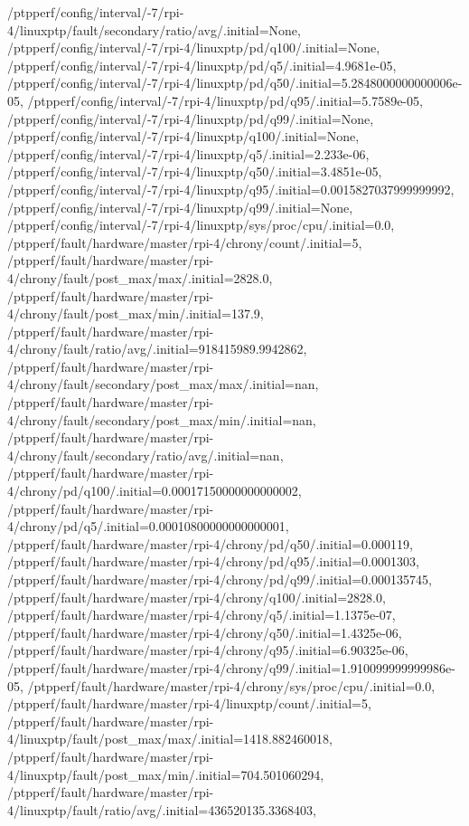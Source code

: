 {    /ptpperf/config/interval/-7/rpi-4/linuxptp/fault/secondary/ratio/avg/.initial=None,
    /ptpperf/config/interval/-7/rpi-4/linuxptp/pd/q100/.initial=None,
    /ptpperf/config/interval/-7/rpi-4/linuxptp/pd/q5/.initial=4.9681e-05,
    /ptpperf/config/interval/-7/rpi-4/linuxptp/pd/q50/.initial=5.2848000000000006e-05,
    /ptpperf/config/interval/-7/rpi-4/linuxptp/pd/q95/.initial=5.7589e-05,
    /ptpperf/config/interval/-7/rpi-4/linuxptp/pd/q99/.initial=None,
    /ptpperf/config/interval/-7/rpi-4/linuxptp/q100/.initial=None,
    /ptpperf/config/interval/-7/rpi-4/linuxptp/q5/.initial=2.233e-06,
    /ptpperf/config/interval/-7/rpi-4/linuxptp/q50/.initial=3.4851e-05,
    /ptpperf/config/interval/-7/rpi-4/linuxptp/q95/.initial=0.0015827037999999992,
    /ptpperf/config/interval/-7/rpi-4/linuxptp/q99/.initial=None,
    /ptpperf/config/interval/-7/rpi-4/linuxptp/sys/proc/cpu/.initial=0.0,
    /ptpperf/fault/hardware/master/rpi-4/chrony/count/.initial=5,
    /ptpperf/fault/hardware/master/rpi-4/chrony/fault/post_max/max/.initial=2828.0,
    /ptpperf/fault/hardware/master/rpi-4/chrony/fault/post_max/min/.initial=137.9,
    /ptpperf/fault/hardware/master/rpi-4/chrony/fault/ratio/avg/.initial=918415989.9942862,
    /ptpperf/fault/hardware/master/rpi-4/chrony/fault/secondary/post_max/max/.initial=nan,
    /ptpperf/fault/hardware/master/rpi-4/chrony/fault/secondary/post_max/min/.initial=nan,
    /ptpperf/fault/hardware/master/rpi-4/chrony/fault/secondary/ratio/avg/.initial=nan,
    /ptpperf/fault/hardware/master/rpi-4/chrony/pd/q100/.initial=0.00017150000000000002,
    /ptpperf/fault/hardware/master/rpi-4/chrony/pd/q5/.initial=0.00010800000000000001,
    /ptpperf/fault/hardware/master/rpi-4/chrony/pd/q50/.initial=0.000119,
    /ptpperf/fault/hardware/master/rpi-4/chrony/pd/q95/.initial=0.0001303,
    /ptpperf/fault/hardware/master/rpi-4/chrony/pd/q99/.initial=0.000135745,
    /ptpperf/fault/hardware/master/rpi-4/chrony/q100/.initial=2828.0,
    /ptpperf/fault/hardware/master/rpi-4/chrony/q5/.initial=1.1375e-07,
    /ptpperf/fault/hardware/master/rpi-4/chrony/q50/.initial=1.4325e-06,
    /ptpperf/fault/hardware/master/rpi-4/chrony/q95/.initial=6.90325e-06,
    /ptpperf/fault/hardware/master/rpi-4/chrony/q99/.initial=1.910099999999986e-05,
    /ptpperf/fault/hardware/master/rpi-4/chrony/sys/proc/cpu/.initial=0.0,
    /ptpperf/fault/hardware/master/rpi-4/linuxptp/count/.initial=5,
    /ptpperf/fault/hardware/master/rpi-4/linuxptp/fault/post_max/max/.initial=1418.882460018,
    /ptpperf/fault/hardware/master/rpi-4/linuxptp/fault/post_max/min/.initial=704.501060294,
    /ptpperf/fault/hardware/master/rpi-4/linuxptp/fault/ratio/avg/.initial=436520135.3368403,
}
